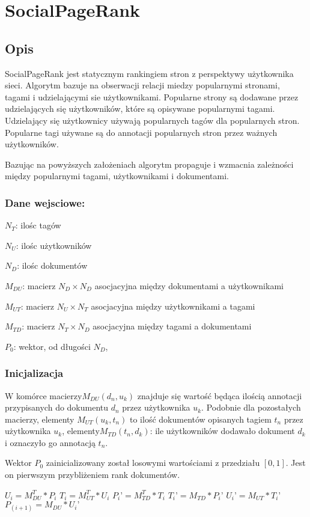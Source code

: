\chapter{SocialPageRank}
\section{Opis}
SocialPageRank jest statycznym rankingiem stron z perspektywy użytkownika sieci. Algorytm bazuje na obserwacji relacji miedzy popularnymi stronami, tagami i udzielającymi sie użytkownikami. Popularne strony są dodawane przez udzielających się użytkowników, które są opisywane popularnymi tagami. Udzielający się użytkownicy używają popularnych tagów dla popularnych stron. Popularne tagi używane są do annotacji popularnych stron przez ważnych użytkowników.

Bazując na powyższych założeniach algorytm propaguje i wzmacnia zależności między popularnymi tagami, użytkownikami i dokumentami. 
\subsection*{Dane wejsciowe:}
$N_T$: ilośc tagów

$N_U$: ilośc użytkowników

$N_D$: ilośc dokumentów

$M_{DU}$: macierz $N_D \times N_D$ asocjacyjna między dokumentami a użytkownikami

$M_{UT}$: macierz $N_U \times N_T$  asocjacyjna między użytkownikami a tagami

$M_{TD}$: macierz $N_T \times N_D$ asocjacyjna między tagami a dokumentami

$P_0$: wektor, od długości $N_D$, 

\subsection*{Inicjalizacja}
W komórce macierzy$M_{DU}(d_n, u_k)$ znajduje się wartość będąca ilością annotacji przypisanych do dokumentu $d_n$ przez użytkownika $u_k$. Podobnie dla pozostałych macierzy, elementy $M_{UT}(u_k, t_n)$ to ilość dokumentów opisanych tagiem $t_n$ przez użytkownika $u_k$, elementy$M_{TD}(t_n, d_k)$: ile użytkowników dodawało dokument $d_k$ i oznaczyło go annotacją $t_n$. 

Wektor $P_0$ zainicializowany został losowymi wartościami z przedziału $[0,1]$. Jest on pierwszym przybliżeniem rank dokumentów.


\begin{algorithmic}
\REPEAT
\STATE $U_i = M_{DU}^T * P_i$
\STATE $T_i = M_{UT}^T * U_i$
\STATE $P_i’ = M_{TD}^T * T_i$
\STATE $T_i’ = M_{TD}  * P_i’$
\STATE $U_i’ = M_{UT} * T_i’$
\STATE $P_(i+1) = M_{DU} * U_i’$
\end{algorithmic}

